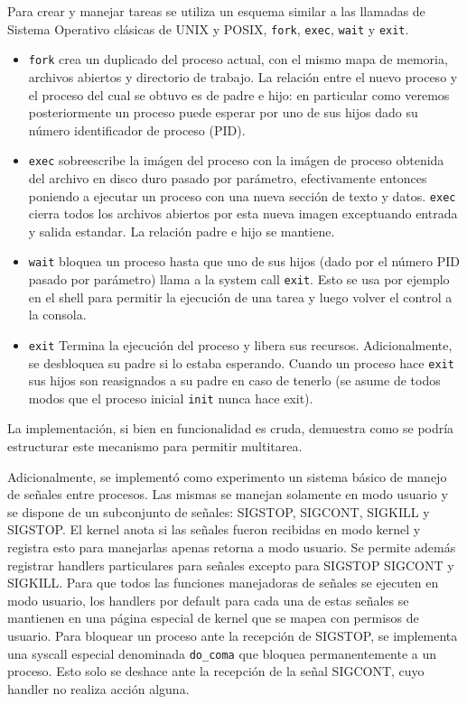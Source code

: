 Para crear y manejar tareas se utiliza un esquema similar a las llamadas de Sistema Operativo cl\'asicas de UNIX y POSIX, \texttt{fork},
\texttt{exec}, \texttt{wait} y \texttt{exit}.

\begin{itemize}
	\item \texttt{fork} crea un duplicado del proceso actual, con el mismo mapa de memoria, archivos abiertos y directorio de trabajo.
	La relaci\'on entre el nuevo proceso y el proceso del cual se obtuvo es de padre e hijo: en particular como veremos posteriormente
	un proceso puede esperar por uno de sus hijos dado su n\'umero identificador de proceso (PID).
	\item \texttt{exec} sobreescribe la im\'agen del proceso con la im\'agen de proceso obtenida del archivo en disco duro pasado por
	par\'ametro, efectivamente entonces poniendo a ejecutar un proceso con una nueva secci\'on de texto y datos. \texttt{exec} cierra
	todos los archivos abiertos por esta nueva imagen exceptuando entrada y salida estandar. La relaci\'on padre e hijo se mantiene.
	\item \texttt{wait} bloquea un proceso hasta que uno de sus hijos (dado por el n\'umero PID pasado por par\'ametro) llama a la
	system call \texttt{exit}. Esto se usa por ejemplo en el shell para permitir la ejecuci\'on de una tarea y luego volver el control
	a la consola.
	\item \texttt{exit} Termina la ejecuci\'on del proceso y libera sus recursos. Adicionalmente, se desbloquea su padre si lo estaba
	esperando. Cuando un proceso hace \texttt{exit} sus hijos son reasignados a su padre en caso de tenerlo (se asume de todos modos que
	el proceso inicial \texttt{init} nunca hace exit).
\end{itemize}

La implementaci\'on, si bien en funcionalidad es cruda, demuestra como se podr\'ia estructurar este mecanismo para permitir multitarea.

Adicionalmente, se implement\'o como experimento un sistema b\'asico de manejo de se\~nales entre procesos. Las mismas se manejan solamente
en modo usuario y se dispone de un subconjunto de se\~nales: SIGSTOP, SIGCONT, SIGKILL y SIGSTOP. El kernel anota si las se\~nales fueron
recibidas en modo kernel y registra esto para manejarlas apenas retorna a modo usuario. Se permite adem\'as registrar handlers particulares
para se\~nales excepto para SIGSTOP SIGCONT y SIGKILL. 
Para que todos las funciones manejadoras de se\~nales se ejecuten en modo usuario, los handlers por default para cada una de estas se\~nales
se mantienen en una p\'agina especial de kernel que se mapea con permisos de usuario. Para bloquear un proceso ante la recepci\'on de
SIGSTOP, se implementa una syscall especial denominada \texttt{do\_coma} que bloquea permanentemente a un proceso. Esto solo se deshace ante
la recepci\'on de la se\~nal SIGCONT, cuyo handler no realiza acci\'on alguna. 

